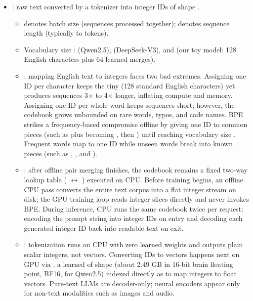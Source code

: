 \begin{itemize}
    \item {}: raw text converted by a tokenizer into integer IDs of shape \shape{[B, T]}.
    \begin{itemize}
        \item {} denotes batch size (sequences processed together);  denotes sequence length (typically  to  tokens).
        \item Vocabulary size :  (Qwen2.5),  (DeepSeek-V3), and  (our toy model: 128 English characters plus 64 learned merges).
        \item {}: mapping English text to integers faces two bad extremes. Assigning one ID per character keeps the  tiny (128 standard English characters) yet produces sequences 3$\times$ to 4$\times$ longer, inflating compute and memory. Assigning one ID per whole word keeps sequences short; however, the codebook grows unbounded on rare words, typos, and code names. BPE strikes a frequency-based compromise offline by giving one ID to common pieces (such as  plus  becoming , then ) until reaching vocabulary size . Frequent words map to one ID while unseen words break into known pieces (such as , , and ).
        \item {}: after offline pair merging finishes, the codebook remains a fixed two-way lookup table ( $\leftrightarrow$ ) executed on CPU. Before training begins, an offline CPU pass converts the entire text corpus into a flat integer stream on disk; the GPU training loop reads \shape{[B, T]} integer slices directly and never invokes BPE. During inference, CPU runs the same codebook twice per request: encoding the prompt string into integer IDs on entry and decoding each generated integer ID back into readable text on exit.
        \item \todo{}: tokenization runs on CPU with zero learned weights and outputs plain scalar integers, not vectors. Converting IDs to vectors happens next on GPU via , a learned  of shape \shape{[V, D]} (about 2.49 GB in 16-bit brain floating point, BF16, for Qwen2.5) indexed directly as  to map \shape{[B, T]} integers to \shape{[B, T, D]} float vectors. Pure-text LLMs are decoder-only; neural encoders appear only for non-text modalities such as images and audio.

\end{itemize}
\end{itemize}
